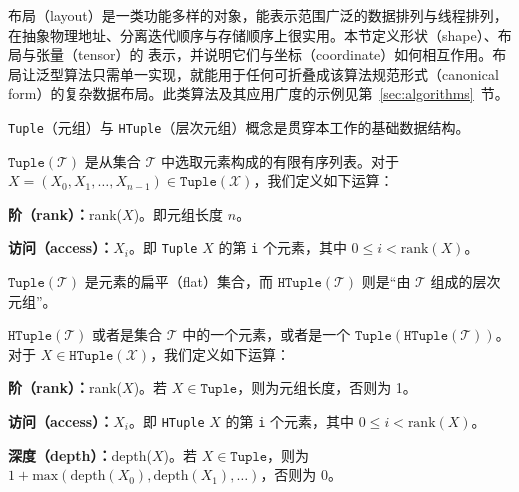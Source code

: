

\CuTe 布局（layout）是一类功能多样的对象，能表示范围广泛的数据排列与线程排列，在抽象物理地址、分离迭代顺序与存储顺序上很实用。本节定义形状（shape）、布局与张量（tensor）的 \CuTe 表示，并说明它们与坐标（coordinate）如何相互作用。\CuTe 布局让泛型算法只需单一实现，就能用于任何可折叠成该算法规范形式（canonical form）的复杂数据布局。此类算法及其应用广度的示例见第~\ref{sec:algorithms}~节。


{\tt Tuple}（元组）与 {\tt HTuple}（层次元组）概念是贯穿本工作的基础数据结构。

\begin{definition}
$\texttt{Tuple}(\mathcal{T})$ 是从集合 $\mathcal{T}$ 中选取元素构成的有限有序列表。对于 $X = (X_0,X_1,\ldots,X_{n-1}) \in \texttt{Tuple}(\mathcal{X})$，我们定义如下运算：
\begin{compactitem}
\item {\bf 阶（rank）：}rank($X$)。即元组长度 $n$。
\item {\bf 访问（access）：}$X_i$。即 \texttt{Tuple} $X$ 的第 \texttt{i} 个元素，其中 $0 \leq i < \text{rank}(X)$。
\end{compactitem}
\end{definition}

\noindent $\texttt{Tuple}(\mathcal{T})$ 是元素的扁平（flat）集合，而 $\texttt{HTuple}(\mathcal{T})$ 则是“由 $\mathcal{T}$ 组成的层次元组”。

\begin{definition}
$\texttt{HTuple}(\mathcal{T})$ 或者是集合 $\mathcal{T}$ 中的一个元素，或者是一个 $\texttt{Tuple}(\texttt{HTuple}(\mathcal{T}))$。对于 $X \in \texttt{HTuple}(\mathcal{X})$，我们定义如下运算：
\begin{compactitem}
\item {\bf 阶（rank）：}rank($X$)。若 $X \in \texttt{Tuple}$，则为元组长度，否则为 1。
\item {\bf 访问（access）：}$X_i$。即 \texttt{HTuple} $X$ 的第 \texttt{i} 个元素，其中 $0 \leq i < \text{rank}(X)$。
\item {\bf 深度（depth）：}depth($X$)。若 $X \in \texttt{Tuple}$，则为 $1 + \text{max}(\text{depth}(X_0), \text{depth}(X_1), \ldots)$，否则为 0。
\end{compactitem}
\end{definition}

